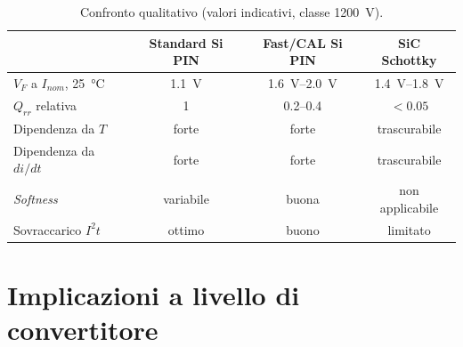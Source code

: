 \begin{table}[htbp]
\centering
\caption{Confronto qualitativo (valori indicativi, classe \SI{1200}{\volt}).}
\begin{tabular}{lccc}
\toprule
 & Standard Si PIN & Fast/CAL Si PIN & SiC Schottky \\
\midrule
$V_F$ a $I_{nom}$, \SI{25}{\celsius} & \SI{1.1}{\volt} & \SIrange{1.6}{2.0}{\volt} & \SIrange{1.4}{1.8}{\volt} \\
$Q_{rr}$ relativa & 1 & 0.2--0.4 & $<0.05$ \\
Dipendenza da $T$ & forte & forte & trascurabile \\
Dipendenza da $di/dt$ & forte & forte & trascurabile \\
\emph{Softness} & variabile & buona & non applicabile \\
Sovraccarico $I^{2}t$ & ottimo & buono & limitato \\
\bottomrule
\end{tabular}
\end{table}

\section{Implicazioni a livello di convertitore}

